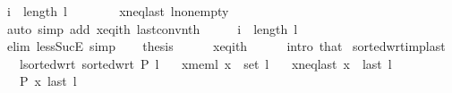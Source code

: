 \begin{isabellebody}
\ {\isachardoublequoteopen}i\ {\isasymnoteq}\ length\ l\ {\isacharminus}{\kern0pt}\ {}{\isachardoublequoteclose}\isanewline
\ \ \ \ \isamarkupfalse%
\ x{\isacharunderscore}{\kern0pt}neq{\isacharunderscore}{\kern0pt}last\ l{\isacharunderscore}{\kern0pt}non{\isacharunderscore}{\kern0pt}empty\isanewline
\ \ \ \ \isamarkupfalse%
\ {\isacharparenleft}{\kern0pt}auto\ simp\ add{\isacharcolon}{\kern0pt}\ x{\isacharunderscore}{\kern0pt}eq{\isacharunderscore}{\kern0pt}ith\ last{\isacharunderscore}{\kern0pt}conv{\isacharunderscore}{\kern0pt}nth{\isacharparenright}{\kern0pt}\isanewline
\ \ \isamarkupfalse%
\ \isamarkupfalse%
\ {\isachardoublequoteopen}i\ {\isacharless}{\kern0pt}\ length\ l\ {\isacharminus}{\kern0pt}\ {}{\isachardoublequoteclose}\isanewline
\ \ \ \ \isamarkupfalse%
\ {\isacharparenleft}{\kern0pt}elim\ less{\isacharunderscore}{\kern0pt}SucE{\isacharparenright}{\kern0pt}\ simp{\isacharplus}{\kern0pt}\isanewline
\ \ \isamarkupfalse%
\ {\isacharquery}{\kern0pt}thesis\isanewline
\ \ \ \ \isamarkupfalse%
\ x{\isacharunderscore}{\kern0pt}eq{\isacharunderscore}{\kern0pt}ith\isanewline
\ \ \ \ \isamarkupfalse%
\ {\isacharparenleft}{\kern0pt}intro\ that{\isacharparenright}{\kern0pt}\isanewline
{}\isamarkupfalse%
%
\endisatagproof
{\isafoldproof}%
%
\isadelimproof
\isanewline
%
\endisadelimproof
%
\isadeliminvisible
\isanewline
%
\endisadeliminvisible
%
\isataginvisible
{}\isamarkupfalse%
\ sorted{\isacharunderscore}{\kern0pt}wrt{\isacharunderscore}{\kern0pt}imp{\isacharunderscore}{\kern0pt}last{\isacharcolon}{\kern0pt}\isanewline
\ \ \ l{\isacharunderscore}{\kern0pt}sorted{\isacharunderscore}{\kern0pt}wrt{\isacharcolon}{\kern0pt}\ {\isachardoublequoteopen}sorted{\isacharunderscore}{\kern0pt}wrt\ P\ l{\isachardoublequoteclose}\isanewline
\ \ \ x{\isacharunderscore}{\kern0pt}mem{\isacharunderscore}{\kern0pt}l{\isacharcolon}{\kern0pt}\ {\isachardoublequoteopen}x\ {\isasymin}\ set\ l{\isachardoublequoteclose}\isanewline
\ \ \ x{\isacharunderscore}{\kern0pt}neq{\isacharunderscore}{\kern0pt}last{\isacharcolon}{\kern0pt}\ {\isachardoublequoteopen}x\ {\isasymnoteq}\ last\ l{\isachardoublequoteclose}\isanewline
\ \ \ {\isachardoublequoteopen}P\ x\ {\isacharparenleft}{\kern0pt}last\ l{\isacharparenright}{\kern0pt}{\isachardoublequoteclose}%
\endisataginvisible
{\isafoldinvisible}%
%
\isadeliminvisible
\isanewline

\end{isabellebody}
